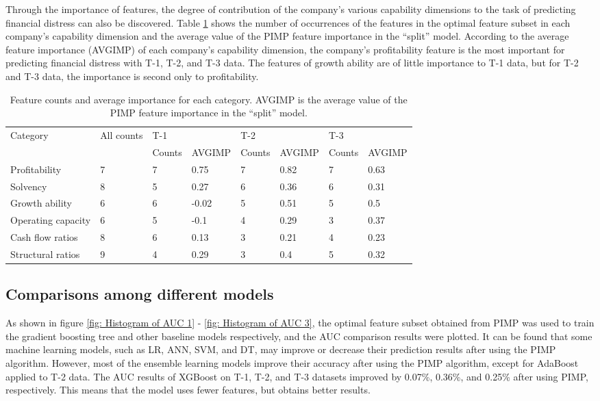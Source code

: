 \documentclass[review]{elsarticle}
\begin{document}
Through the importance of features, the degree of contribution of the company's various capability dimensions to the task of predicting financial distress can also be discovered. Table \ref{table: company ability} shows the number of occurrences of the features in the optimal feature subset in each company's capability dimension and the average value of the PIMP feature importance in the ``split'' model. According to the average feature importance (AVGIMP) of each company's capability dimension, the company's profitability feature is the most important for predicting financial distress with T-1, T-2, and T-3 data. The features of growth ability are of little importance to T-1 data, but for T-2 and T-3 data, the importance is second only to profitability.

\begin{table}[H]\footnotesize
    \centering
    \caption{Feature counts and average importance for each category. AVGIMP is the average value of the PIMP feature importance in the ``split'' model.}
    \label{table: company ability}
    \begin{tabular}{llllllll}
    \hline
    \multirow{2}{*}{Category} & \multirow{2}{*}{All counts} & \multicolumn{2}{l}{T-1} & \multicolumn{2}{l}{T-2} & \multicolumn{2}{l}{T-3} \\ \cline{3-8}
     &  & Counts & AVGIMP & Counts & AVGIMP& Counts & AVGIMP \\ \hline
    Profitability & 7 & 7 & 0.75 & 7 & 0.82 & 7 & 0.63 \\
    Solvency & 8 & 5 & 0.27 & 6 & 0.36 & 6 & 0.31 \\
    Growth ability & 6 & 6 & -0.02 & 5 & 0.51 & 5 & 0.5 \\
    Operating capacity & 6 & 5 & -0.1 & 4 & 0.29 & 3 & 0.37 \\
    Cash flow ratios & 8 & 6 & 0.13 & 3 & 0.21 & 4 & 0.23 \\
    Structural ratios & 9 & 4 & 0.29 & 3 & 0.4 & 5 & 0.32 \\ \hline
    \end{tabular}
    \end{table}

\subsection{Comparisons among different models}
As shown in figure \ref{fig: Histogram of AUC 1} - \ref{fig: Histogram of AUC 3}, the optimal feature subset obtained from PIMP was used to train the gradient boosting tree and other baseline models respectively, and the AUC comparison results were plotted. It can be found that some machine learning models, such as LR, ANN, SVM, and DT, may improve or decrease their prediction results after using the PIMP algorithm. However, most of the ensemble learning models improve their accuracy after using the PIMP algorithm, except for AdaBoost applied to T-2 data. The AUC results of XGBoost on T-1, T-2, and T-3 datasets improved by 0.07\%, 0.36\%, and 0.25\% after using PIMP, respectively. This means that the model uses fewer features, but obtains better results.
\end{document}
